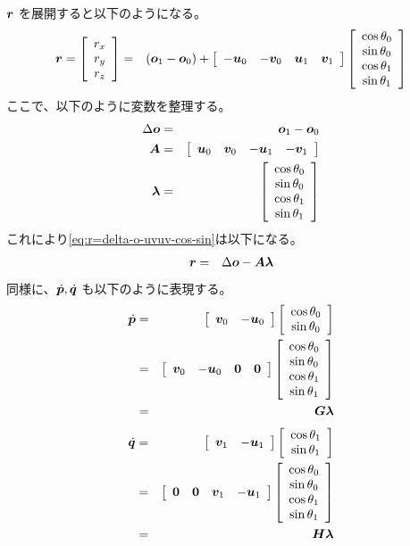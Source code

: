 \documentclass[11pt,a4j]{jarticle}
\begin{document}
${\bm{r}}$ を展開すると以下のようになる。
  \begin{eqnarray}
    {\bm{r}} = \left[ \begin{array}[c]{c} r_x \\ r_y \\ r_z \end{array} \right]
      & = &
        ({\bm{o}}_1 - {\bm{o}}_0)
      + \left[ \begin{array}[c]{cccc} -{\bm{u}}_0 & -{\bm{v}}_0 & {\bm{u}}_1 & {\bm{v}}_1 \end{array} \right]
        \left[ \begin{array}[c]{c} \cos \theta_0 \\
             \sin \theta_0 \\
             \cos \theta_1 \\
             \sin \theta_1 \end{array} \right]
  \label{eq:r=delta-o-uvuv-cos-sin}
  \end{eqnarray}
ここで、以下のように変数を整理する。
  \begin{eqnarray}
    \Delta {\bm{o}}
      & = &
        {\bm{o}}_1 - {\bm{o}}_0
  \\
    {\bm{A} }
      & = &
        \left[ \begin{array}[c]{cccc} {\bm{u}}_0 & {\bm{v}}_0 & -{\bm{u}}_1 & -{\bm{v}}_1 \end{array} \right]
  \\
    {\bm{\lambda}}
      & = &
        \left[ \begin{array}[c]{c} \cos \theta_0 \\
             \sin \theta_0 \\
             \cos \theta_1 \\
             \sin \theta_1 \end{array} \right]
  \end{eqnarray}
これにより\eqref{eq:r=delta-o-uvuv-cos-sin}は以下になる。
  \begin{eqnarray}
    {\bm{r}}
      & = &
        \Delta {\bm{o}} -
        {\bm{A} } {\bm{\lambda}}
  \end{eqnarray}
同様に、$\dot{{\bm{p}}}, \dot{{\bm{q}}}$ も以下のように表現する。
  \begin{eqnarray}
    \dot{{\bm{p}}}
      & = &
        \left[ \begin{array}[c]{cc} {\bm{v}}_0 & -{\bm{u}}_0 \end{array} \right] \left[ \begin{array}[c]{c} \cos \theta_0 \\ \sin \theta_0 \end{array} \right]
  \\
      & = &
        \left[ \begin{array}[c]{cccc} {\bm{v}}_0 & -{\bm{u}}_0 & {\bm{0}} & {\bm{0}} \end{array} \right]
        \left[ \begin{array}[c]{c} \cos \theta_0 \\ \sin \theta_0 \\ \cos \theta_1 \\ \sin \theta_1 \end{array} \right]
  \\
      & = &
        {\bm{G} } {\bm{\lambda}}
  \end{eqnarray}
  \begin{eqnarray}
    \dot{{\bm{q}}}
      & = &
        \left[ \begin{array}[c]{cc} {\bm{v}}_1 & -{\bm{u}}_1 \end{array} \right] \left[ \begin{array}[c]{c} \cos \theta_1 \\ \sin \theta_1 \end{array} \right]
  \\
      & = &
        \left[ \begin{array}[c]{cccc} {\bm{0}} & {\bm{0}} & {\bm{v}}_1 & -{\bm{u}}_1 \end{array} \right]
        \left[ \begin{array}[c]{c} \cos \theta_0 \\ \sin \theta_0 \\ \cos \theta_1 \\ \sin \theta_1 \end{array} \right]
  \\
      & = &
        {\bm{H} } {\bm{\lambda}}
  \end{eqnarray}
\end{document}
